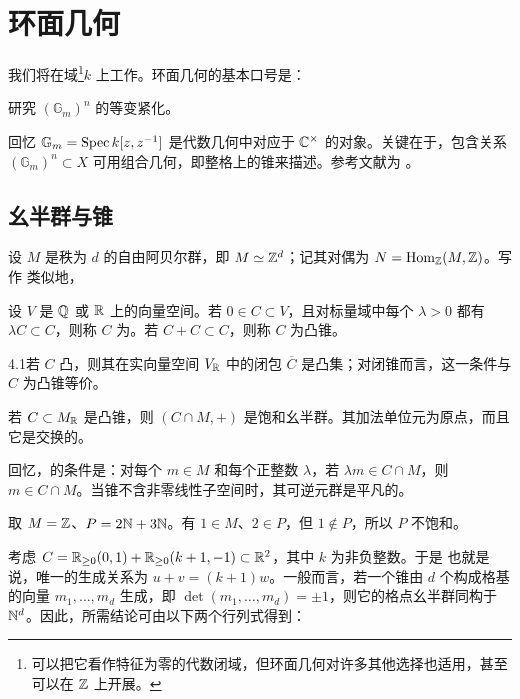 \chapter{环面几何}
我们将在域\footnote{可以把它看作特征为零的代数闭域，但环面几何对许多其他选择也适用，甚至可以在 $\mathbb Z$ 上开展。}$k$ 上工作。环面几何的基本口号是：
\begin{center}研究 $(\mathbb G_m)^n$ 的等变紧化。\end{center}
回忆 $\mathbb G_m=\operatorname{Spec} k[z,z^{-1}]$ 是代数几何中对应于 $\mathbb C^\times$ 的对象。关键在于，包含关系 $(\mathbb G_m)^n\subset X$ 可用组合几何，即整格上的锥来描述。参考文献为 \cite{ref7,ref10,ref24}。
\section{幺半群与锥}
设 $M$ 是秩为 $d$ 的自由阿贝尔群，即 $M\simeq\mathbb Z^d$；记其对偶为 $N=\operatorname{Hom}_{\mathbb Z}(M,\mathbb Z)$。写作
类似地，
\begin{definition}\label{def:4.1}
设 $V$ 是 $\mathbb Q$ 或 $\mathbb R$ 上的向量空间。若 $0\in C\subset V$，且对标量域中每个 $\lambda>0$ 都有 $\lambda C\subset C$，则称 $C$ 为。若 $C+C\subset C$，则称 $C$ 为凸锥。
\end{definition}
\begin{Note}{4.1}若 $C$ 凸，则其在实向量空间 $V_{\mathbb R}$ 中的闭包 $\overline C$ 是凸集；对闭锥而言，这一条件与 $C$ 为凸锥等价。\end{Note}
\begin{lemma}\label{lem:4.1}
若 $C\subset M_{\mathbb R}$ 是凸锥，则 $(C\cap M,+)$ 是饱和幺半群。其加法单位元为原点，而且它是交换的。
\end{lemma}
回忆，的条件是：对每个 $m\in M$ 和每个正整数 $\lambda$，若 $\lambda m\in C\cap M$，则 $m\in C\cap M$。当锥不含非零线性子空间时，其可逆元群是平凡的。
\begin{example}\label{ex:4.1}
取 $M=\mathbb Z$、$P=2\mathbb N+3\mathbb N$。有 $1\in M$、$2\in P$，但 $1\notin P$，所以 $P$ 不饱和。
\end{example}
\begin{example}\label{ex:4.2}
考虑 $C=\mathbb R_{\ge0}(0,1)+\mathbb R_{\ge0}(k+1,-1)\subset\mathbb R^2$，其中 $k$ 为非负整数。于是
也就是说，唯一的生成关系为 $u+v=(k+1)w$。一般而言，若一个锥由 $d$ 个构成格基的向量 $m_1,\ldots,m_d$ 生成，即 $\det(m_1,\ldots,m_d)=\pm1$，则它的格点幺半群同构于 $\mathbb N^d$。因此，所需结论可由以下两个行列式得到：
\end{example}
